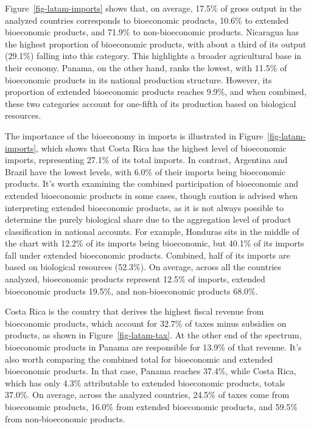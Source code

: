 \documentclass[
  letterpaper,
  DIV=11,
  numbers=noendperiod]{scrartcl}
\begin{document}
Figure~\ref{fig-latam-imports} shows that, on average, 17.5\% of gross
output in the analyzed countries corresponds to bioeconomic products,
10.6\% to extended bioeconomic products, and 71.9\% to non-bioeconomic
products. Nicaragua has the highest proportion of bioeconomic products,
with about a third of its output (29.1\%) falling into this category.
This highlights a broader agricultural base in their economy. Panama, on
the other hand, ranks the lowest, with 11.5\% of bioeconomic products in
its national production structure. However, its proportion of extended
bioeconomic products reaches 9.9\%, and when combined, these two
categories account for one-fifth of its production based on biological
resources.

The importance of the bioeconomy in imports is illustrated in
Figure~\ref{fig-latam-imports}, which shows that Costa Rica has the
highest level of bioeconomic imports, representing 27.1\% of its total
imports. In contrast, Argentina and Brazil have the lowest levels, with
6.0\% of their imports being bioeconomic products. It's worth examining
the combined participation of bioeconomic and extended bioeconomic
products in some cases, though caution is advised when interpreting
extended bioeconomic products, as it is not always possible to determine
the purely biological share due to the aggregation level of product
classification in national accounts. For example, Honduras sits in the
middle of the chart with 12.2\% of its imports being bioeconomic, but
40.1\% of its imports fall under extended bioeconomic products.
Combined, half of its imports are based on biological resources
(52.3\%). On average, across all the countries analyzed, bioeconomic
products represent 12.5\% of imports, extended bioeconomic products
19.5\%, and non-bioeconomic products 68.0\%.

Costa Rica is the country that derives the highest fiscal revenue from
bioeconomic products, which account for 32.7\% of taxes minus subsidies
on products, as shown in Figure~\ref{fig-latam-tax}. At the other end of
the spectrum, bioeconomic products in Panama are responsible for 13.9\%
of that revenue. It's also worth comparing the combined total for
bioeconomic and extended bioeconomic products. In that case, Panama
reaches 37.4\%, while Costa Rica, which has only 4.3\% attributable to
extended bioeconomic products, totals 37.0\%. On average, across the
analyzed countries, 24.5\% of taxes come from bioeconomic products,
16.0\% from extended bioeconomic products, and 59.5\% from
non-bioeconomic products.
\end{document}
